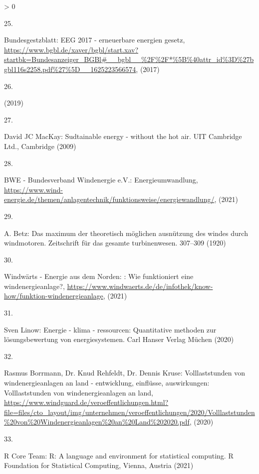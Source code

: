 \documentclass[a4paper,11pt]{article}
\newlength{\cslhangindent}
\newlength{\csllabelwidth}
\newenvironment{CSLReferences}[3] %
 {%
  \setlength{\parindent}{0pt}
  \ifodd #1 \everypar{\setlength{\hangindent}{\cslhangindent}}\ignorespaces\fi
  \ifnum #2 > 0
  \setlength{\parskip}{#2\baselineskip}
  \fi
 }%
 {}
\newcommand{\CSLLeftMargin}[1]{\parbox[t]{\maxof{\widthof{#1}}{\csllabelwidth}}{#1}}
\newcommand{\CSLRightInline}[1]{\parbox[t]{\linewidth}{#1}}
\begin{document}
\begin{CSLReferences}{0}{0}
\leavevmode\hypertarget{ref-Bundesgestzblatt.2017}{}%
\CSLLeftMargin{25. }
\CSLRightInline{Bundesgestzblatt: EEG 2017 - erneuerbare energien gesetz, \url{https://www.bgbl.de/xaver/bgbl/start.xav?startbk=Bundesanzeiger_BGBl\#__bgbl__\%2F\%2F*\%5B\%40attr_id\%3D\%27bgbl116s2258.pdf\%27\%5D__1625223566574}, (2017)}

\leavevmode\hypertarget{ref-EnergieagenturRheinlandPfalz.2019}{}%
\CSLLeftMargin{26. }
\CSLRightInline{(2019)}

\leavevmode\hypertarget{ref-DavidJCMacKay.2009}{}%
\CSLLeftMargin{27. }
\CSLRightInline{David JC MacKay: Sudtainable energy - without the hot air. {UIT Cambridge Ltd.}, Cambridge (2009)}

\leavevmode\hypertarget{ref-BWE.2021}{}%
\CSLLeftMargin{28. }
\CSLRightInline{BWE - Bundesverband Windenergie e.V.: Energieumwandlung, \url{https://www.wind-energie.de/themen/anlagentechnik/funktionsweise/energiewandlung/}, (2021)}

\leavevmode\hypertarget{ref-A.Betz.1920}{}%
\CSLLeftMargin{29. }
\CSLRightInline{A. Betz: Das maximum der theoretisch m{ö}glichen ausn{ü}tzung des windes durch windmotoren. Zeitschrift f{ü}r das gesamte turbinenwesen. 307--309 (1920)}

\leavevmode\hypertarget{ref-WindwartsEnergieausdemNorden.2021}{}%
\CSLLeftMargin{30. }
\CSLRightInline{Windwärts - Energie aus dem Norden: : Wie funktioniert eine windenergieanlage?, \url{https://www.windwaerts.de/de/infothek/know-how/funktion-windenergieanlage}, (2021)}

\leavevmode\hypertarget{ref-SvenLinow.2020}{}%
\CSLLeftMargin{31. }
\CSLRightInline{Sven Linow: Energie - klima - ressourcen: Quantitative methoden zur l{ö}sungsbewertung von energiesystemen. {Carl Hanser Verlag M{ü}chen} (2020)}

\leavevmode\hypertarget{ref-RasmusBorrmannDr.KnudRehfeldtDr.DennisKruse.2020}{}%
\CSLLeftMargin{32. }
\CSLRightInline{Rasmus Borrmann, Dr. Knud Rehfeldt, Dr. Dennis Kruse: Volllaststunden von windenergieanlagen an land - entwicklung, einfl{ü}sse, auswirkungen: Volllaststunden von windenergieanlagen an land, \url{https://www.windguard.de/veroeffentlichungen.html?file=files/cto_layout/img/unternehmen/veroeffentlichungen/2020/Volllaststunden\%20von\%20Windenergieanlagen\%20an\%20Land\%202020.pdf}, (2020)}

\leavevmode\hypertarget{ref-R}{}%
\CSLLeftMargin{33. }
\CSLRightInline{R Core Team: R: A language and environment for statistical computing. R Foundation for Statistical Computing, Vienna, Austria (2021)}


\end{CSLReferences}
\end{document}
